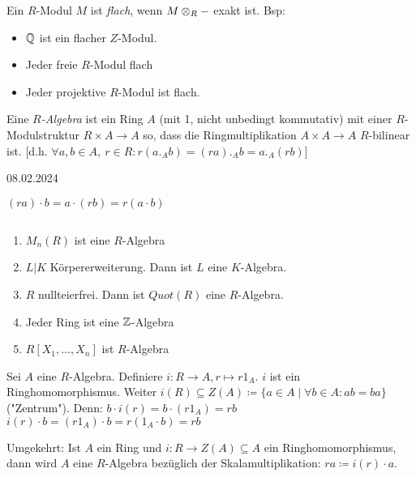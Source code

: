 \documentclass[../main.tex]{subfiles}
\begin{document}
Ein $R$-Modul $M$ ist \emph{flach}, wenn $M\otimes_R -$ exakt ist.
Bsp: 
\begin{itemize}[noitemsep]
    \item $\mathbb{Q}$ ist ein flacher $Z$-Modul.
    \item Jeder freie $R$-Modul flach
    \item Jeder projektive $R$-Modul ist flach.
\end{itemize}

\begin{definition}
    Eine \emph{$R$-Algebra} ist ein Ring $A$ (mit 1, nicht unbedingt kommutativ) mit einer $R$-Modulstruktur $R\times A \rightarrow A$ so, dass die Ringmultiplikation $A\times A\rightarrow A$ $R$-bilinear ist.
    [d.h. $\forall a,b\in A,\ r\in R: r(a._Ab) = (ra)._A b = a._A(rb)$]
\end{definition}
\begin{flushright}
    08.02.2024
\end{flushright}
\begin{minipage}{0.3\textwidth}
    $(ra)\cdot b = a\cdot (rb) = r(a\cdot b)$
\end{minipage}
\begin{example}$ $
    \begin{enumerate}[label=(\roman*)]
        \item $M_n (R)$ ist eine $R$-Algebra
        \item $L|K$ Körpererweiterung. Dann ist $L$ eine $K$-Algebra.
        \item $R$ nullteierfrei. Dann ist $Quot(R)$ eine $R$-Algebra.
        \item Jeder Ring ist eine $\mathbb{Z}$-Algebra
        \item $R[X_1,\dots,X_n]$ ist $R$-Algebra
    \end{enumerate}
\end{example}
\TODO[Ab hier]
\begin{remark}
    Sei $A$ eine $R$-Algebra. Definiere $i:R\rightarrow A, r\mapsto r1_A$.
    $i$ ist ein Ringhomomorphismus.
    Weiter $i(R)\subseteq Z(A)\coloneqq \{a\in A \mid \forall b \in A: ab = ba\}$ ("Zentrum").
    Denn: $b\cdot i(r) = b \cdot (r1_A) = rb$\\
    $i(r)\cdot b = (r1_A)\cdot b = r(1_A\cdot b) = rb$

    Umgekehrt:
    Ist $A$ ein Ring und $i:R\rightarrow Z(A) \subseteq A$ ein Ringhomomorphismus, dann wird $A$ eine $R$-Algebra bezüglich der Skalamultiplikation: $ra\coloneqq i(r)\cdot a$.
\end{remark}
\end{document}
